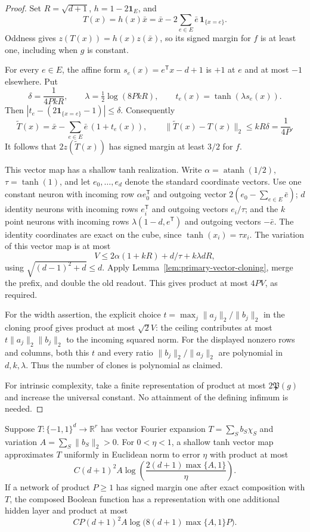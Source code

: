 \begin{proof}
Set $R=\sqrt{d+1}$, $h=1-2\mathbf1_E$, and
\[
 T(x)=h(x)\bar x
     =\bar x-2\sum_{e\in E}\bar e\,\mathbf1_{\{x=e\}}.
\]
Oddness gives $z(T(x))=h(x)z(\bar x)$, so its signed margin for
$f$ is at least one, including when $g$ is constant.

For every $e\in E$, the affine form
$s_e(x)=e^{\mathsf T}x-d+1$ is $+1$ at $e$ and at most $-1$
elsewhere. Put
\[
 \delta=\frac1{4PkR},\qquad
 \lambda=\tfrac12\log(8PkR),\qquad
 t_e(x)=\tanh(\lambda s_e(x)).
\]
Then $|t_e-(2\mathbf1_{\{x=e\}}-1)|\le\delta$. Consequently
\[
 \widetilde T(x)=\bar x-\sum_{e\in E}\bar e\,(1+t_e(x)),
 \qquad
 \|\widetilde T(x)-T(x)\|_2\le kR\delta=\frac1{4P}.
\]
It follows that $2z(\widetilde T(x))$ has signed margin at least
$3/2$ for $f$.

This vector map has a shallow tanh realization. Write
$\alpha=\operatorname{atanh}(1/2)$, $\tau=\tanh(1)$, and let
$e_0,\ldots,e_d$ denote the standard coordinate vectors. Use one
constant neuron with incoming row $\alpha e_0^{\mathsf T}$ and
outgoing vector $2(e_0-\sum_{e\in E}\bar e)$; $d$ identity neurons
with incoming rows $e_i^{\mathsf T}$ and outgoing vectors
$e_i/\tau$; and the $k$ point neurons with incoming rows
$\lambda(1-d,e^{\mathsf T})$ and outgoing vectors $-\bar e$.
The identity coordinates are exact on the cube, since
$\tanh(x_i)=\tau x_i$. The variation of this vector map is at most
\[
 V\le2\alpha(1+kR)+d/\tau+k\lambda dR,
\]
using $\sqrt{(d-1)^2+d}\le d$. Apply
Lemma~\ref{lem:primary-vector-cloning}, merge the prefix, and double
the old readout. This gives product at most $4PV$, as required.

For the width assertion, the explicit choice
$t=\max_j\|a_j\|_2/\|b_j\|_2$ in the cloning proof gives product
at most $\sqrt2V$: the ceiling contributes at most
$t\|a_j\|_2\|b_j\|_2$ to the incoming squared norm. For the
displayed nonzero rows and columns, both this $t$ and every ratio
$\|b_j\|_2/\|a_j\|_2$ are polynomial in $d,k,\lambda$.
Thus the number of clones is polynomial as claimed.

For intrinsic complexity, take a finite representation of product
at most $2\mathfrak P(g)$ and increase the universal constant.
No attainment of the defining infimum is needed.
\end{proof}

\begin{lemma}
\label{lem:primary-fourier-input-editing}
Suppose $T:\{-1,1\}^d\to\mathbb R^r$ has vector Fourier
expansion $T=\sum_S b_S\chi_S$ and variation
$A=\sum_S\|b_S\|_2>0$. For $0<\eta<1$, a shallow tanh vector
map approximates $T$ uniformly in Euclidean norm to error $\eta$
with product at most
\[
 C(d+1)^2A\log\left(\frac{2(d+1)\max\{A,1\}}{\eta}\right).
\]
If a network of product $P\ge1$ has signed margin one after exact
composition with $T$, the composed Boolean function has a
representation with one additional hidden layer and product at most
\[
 CP(d+1)^2A\log\bigl(8(d+1)\max\{A,1\}P\bigr).
\]
\end{lemma}

